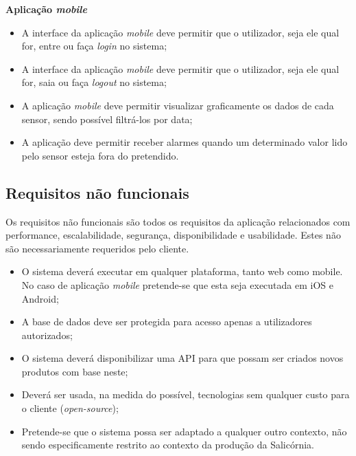 \textbf{Aplicação \textit{mobile}}



\begin{itemize}
	\item A interface da aplicação \textit{mobile} deve permitir que o utilizador, seja ele qual for, entre ou faça \textit{login} no sistema; 
	
	\item A interface da aplicação \textit{mobile} deve permitir que o utilizador, seja ele qual for, saia ou faça \textit{logout} no sistema;
	
	
	\item A aplicação \textit{mobile} deve permitir visualizar graficamente os dados de cada sensor, sendo possível filtrá-los por data;
	
	\item  A aplicação deve permitir receber alarmes quando um determinado valor lido pelo sensor esteja fora do pretendido.
	
	
\end{itemize}



\subsection{Requisitos não funcionais}


Os requisitos não funcionais são todos os requisitos da aplicação relacionados com performance, escalabilidade, segurança, disponibilidade e usabilidade. Estes não são necessariamente requeridos pelo cliente. 


\begin{itemize}
	\item O sistema deverá executar em qualquer plataforma, tanto web como mobile. No caso de aplicação \textit{mobile} pretende-se que esta seja executada em iOS e Android;  
	
	
	\item A base de dados deve ser protegida para acesso apenas a utilizadores autorizados; 
	
	
	\item O sistema deverá disponibilizar uma \ac{API} para que possam ser criados novos produtos com base neste;  
	
	\item Deverá ser usada, na medida do possível, tecnologias sem qualquer custo para o cliente (\textit{open-source}); 
	
	\item Pretende-se que o sistema possa ser adaptado a qualquer outro contexto, não sendo especificamente restrito ao contexto da produção da Salicórnia.  
	
\end{itemize}





